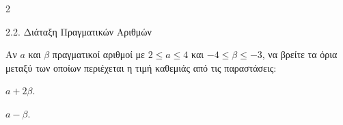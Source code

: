 \begin{ylh}{2}
    \item 2.2. Διάταξη Πραγματικών Αριθμών
\end{ylh}
Αν $a$ και $\beta$ πραγματικοί αριθμοί με $2 \le a \le 4$ και $-4 \le \beta \le -3$, να βρείτε τα όρια μεταξύ των οποίων περιέχεται η τιμή καθεμιάς από τις παραστάσεις: 
\begin{alist}
\item $a + 2\beta$. 
\item $a - \beta$. 
\end{alist}


